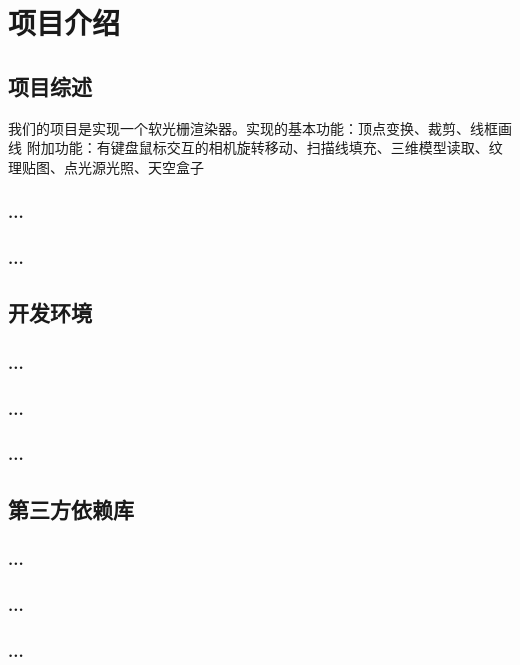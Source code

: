 

    \chapter{项目介绍}

    \section{项目综述}
    	我们的项目是实现一个软光栅渲染器。实现的基本功能：顶点变换、裁剪、线框画线
	附加功能：有键盘鼠标交互的相机旋转移动、扫描线填充、三维模型读取、纹理贴图、点光源光照、天空盒子

    \subsection{...}

    \lipsum[6-10]

    \subsection{...}


    \section{开发环境}
    \subsection{...}

    \lipsum[11-15]

    \subsection{...}

    \subsection{...}



    \section{第三方依赖库}
    \subsection{...}

    \lipsum[21-30]

    \subsection{...}


    \subsection{...}

